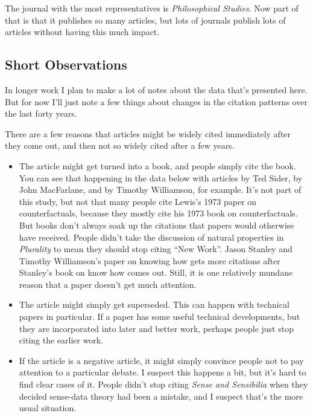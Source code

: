 \documentclass[
  10pt,
  letterpaper,
  DIV=11,
  numbers=noendperiod,
  twoside]{scrartcl}
\providecommand{\tightlist}{%
  \setlength{\itemsep}{0pt}\setlength{\parskip}{0pt}}\usepackage{longtable,booktabs,array}
\begin{document}
The journal with the most representatives is \emph{Philosophical
Studies}. Now part of that is that it publishes so many articles, but
lots of journals publish lots of articles without having this much
impact.

\subsection{Short Observations}\label{short-observations}

In longer work I plan to make a lot of notes about the data that's
presented here. But for now I'll just note a few things about changes in
the citation patterns over the last forty years.

There are a few reasons that articles might be widely cited immediately
after they come out, and then not so widely cited after a few years.

\begin{itemize}
\tightlist
\item
  The article might get turned into a book, and people simply cite the
  book. You can see that happening in the data below with articles by
  Ted Sider, by John MacFarlane, and by Timothy Williamson, for example.
  It's not part of this study, but not that many people cite Lewis's
  1973 paper on counterfactuals, because they mostly cite his 1973 book
  on counterfactuals. But books don't always soak up the citations that
  papers would otherwise have received. People didn't take the
  discussion of natural properties in \emph{Plurality} to mean they
  should stop citing ``New Work''. Jason Stanley and Timothy
  Williamson's paper on knowing how gets more citations after Stanley's
  book on know how comes out. Still, it is one relatively mundane reason
  that a paper doesn't get much attention.
\item
  The article might simply get superseded. This can happen with
  technical papers in particular. If a paper has some useful technical
  developments, but they are incorporated into later and better work,
  perhaps people just stop citing the earlier work.
\item
  If the article is a negative article, it might simply convince people
  not to pay attention to a particular debate. I suspect this happens a
  bit, but it's hard to find clear cases of it. People didn't stop
  citing \emph{Sense and Sensibilia} when they decided sense-data theory
  had been a mistake, and I suspect that's the more usual situation.
\end{itemize}
\end{document}
